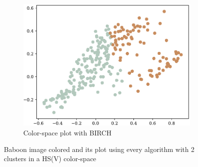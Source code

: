 \documentclass[sigconf,authorversion]{acmart}
\begin{document}
\begin{figure}[hbtp]
  \hspace{0.05\textwidth}
  \begin{subfigure}[b]{0.25\textwidth}
      \includegraphics[width=\textwidth]{../outputs/baboon_2_hsv_plot_birch.pdf}
      \caption{Color-space plot with BIRCH}
      \label{subfig:p_baboon_hsv_birch}
  \end{subfigure}
  \caption{Baboon image colored and its plot using every algorithm with 2 clusters in a HS(V) color-space}
  \label{fig:baboon_2_hsv}
\end{figure}
\end{document}
